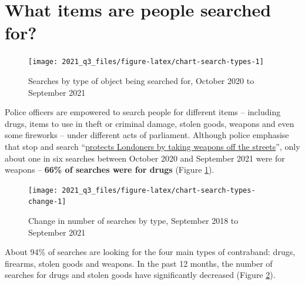 \documentclass[
  a4paper,
  twoside, 11pt]{article}
\begin{document}
\hypertarget{what-items-are-people-searched-for}{%
\section{What items are people searched for?}\label{what-items-are-people-searched-for}}



\begin{figure}[tb]

{\centering \texttt{[image: 2021\_q3\_files/figure-latex/chart-search-types-1]} 

}

\caption{Searches by type of object being searched for, October 2020 to September 2021}\label{fig:chart-search-types}
\end{figure}

Police officers are empowered to search people for different items -- including drugs, items to use in theft or criminal damage, stolen goods, weapons and even some fireworks -- under different acts of parliament. Although police emphasise that stop and search ``\href{https://www.met.police.uk/police-forces/metropolitan-police/areas/about-us/about-the-met/stop-and-search/}{protects Londoners by taking weapons off the streets}'', only about one in six searches between October 2020 and September 2021 were for weapons -- \textbf{66\% of searches were for drugs} (Figure \ref{fig:chart-search-types}).



\begin{figure}[bh]

{\centering \texttt{[image: 2021\_q3\_files/figure-latex/chart-search-types-change-1]} 

}

\caption{Change in number of searches by type, September 2018 to September 2021}\label{fig:chart-search-types-change}
\end{figure}

About 94\% of searches are looking for the four main types of contraband: drugs, firearms, stolen goods and weapons. In the past 12 months, the number of searches for drugs and stolen goods have significantly decreased (Figure \ref{fig:chart-search-types-change}).
\end{document}
